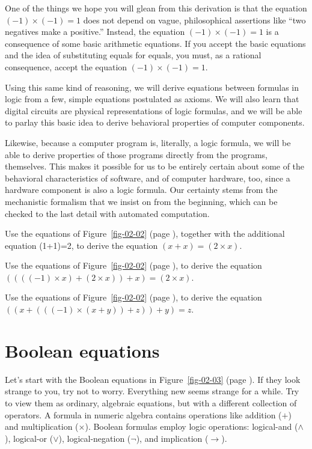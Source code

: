 One of the things we hope you will glean from this derivation is that
the equation $(-1)\times(-1) = 1$ does not depend on vague,
philosophical assertions like ``two negatives make a positive.''
Instead, the equation $(-1)\times(-1) = 1$ is a consequence of some
basic arithmetic equations. If you accept the basic equations
and the idea of substituting equals for equals, you must, as a
rational consequence, accept the equation $(-1)\times(-1) = 1$.

Using this same kind of reasoning, we will derive equations between
formulas in logic from a few, simple equations postulated as
axioms. We will also learn that digital circuits are physical
representations of logic formulas, and we will be able to
parlay this basic idea to derive behavioral properties of
computer components.

Likewise, because a computer program is,
literally, a logic formula, we will be able to derive
properties of those programs directly from the programs,
themselves. This makes it possible for us to be entirely
certain about some of the behavioral characteristics of
software, and of computer hardware, too, since a hardware component is also a logic formula. Our certainty stems from the mechanistic
formalism that we insist on from the beginning,
which can be checked to the last detail with automated computation.

\begin{ExerciseList}
\label{ex:ch02-intro}
\Exercise
Use the equations of Figure~\ref{fig-02-02} (page \pageref{fig-02-02}),
together with the additional equation (1+1)=2, to derive the equation $(x + x) = (2 \times x)$.

\Exercise
Use the equations of Figure~\ref{fig-02-02} (page \pageref{fig-02-02}),
to derive the equation $((((-1) \times x) + (2 \times x)) + x) = (2 \times x)$.

\Exercise
Use the equations of Figure~\ref{fig-02-02} (page \pageref{fig-02-02}),
to derive the equation $((x + (((-1) \times (x + y)) + z)) + y) = z$.
\end{ExerciseList}

\section{Boolean equations}
\label{sec:boolean-equations}
Let's start with the Boolean equations in Figure~\ref{fig-02-03} (page \pageref{fig-02-03}).
If they look strange to you, try not to worry. Everything new seems
strange for a while. Try to view them as ordinary, algebraic
equations, but with a different collection of operators. A
formula in numeric algebra contains operations like addition
($+$) and multiplication ($\times$). Boolean formulas employ logic
operations: logical-and ($\wedge$), logical-or ($\vee$),
logical-negation ($\neg$), and implication ($\rightarrow$).

